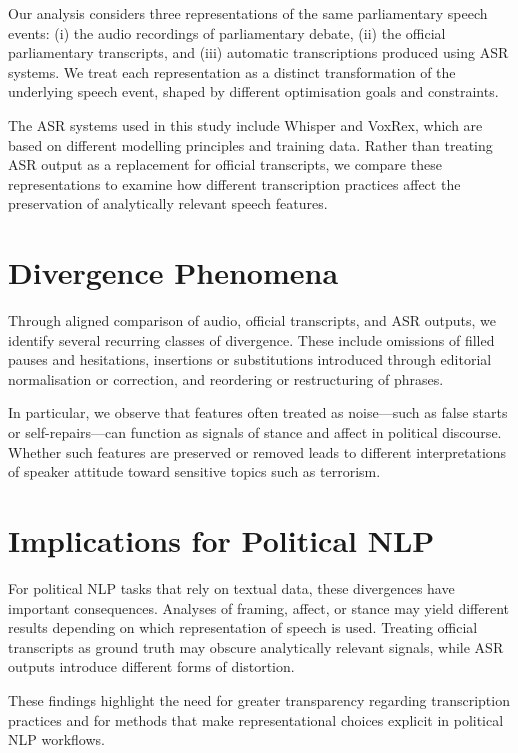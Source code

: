 \documentclass[10pt, a4paper]{article}
\begin{document}
Our analysis considers three representations of the same parliamentary speech events: (i) the audio recordings of parliamentary debate, (ii) the official parliamentary transcripts, and (iii) automatic transcriptions produced using ASR systems. We treat each representation as a distinct transformation of the underlying speech event, shaped by different optimisation goals and constraints.

The ASR systems used in this study include Whisper and VoxRex, which are based on different modelling principles and training data. Rather than treating ASR output as a replacement for official transcripts, we compare these representations to examine how different transcription practices affect the preservation of analytically relevant speech features.

\section{Divergence Phenomena}

Through aligned comparison of audio, official transcripts, and ASR outputs, we identify several recurring classes of divergence. These include omissions of filled pauses and hesitations, insertions or substitutions introduced through editorial normalisation or correction, and reordering or restructuring of phrases.

In particular, we observe that features often treated as noise—such as false starts or self-repairs—can function as signals of stance and affect in political discourse. Whether such features are preserved or removed leads to different interpretations of speaker attitude toward sensitive topics such as terrorism.

\section{Implications for Political NLP}

For political NLP tasks that rely on textual data, these divergences have important consequences. Analyses of framing, affect, or stance may yield different results depending on which representation of speech is used. Treating official transcripts as ground truth may obscure analytically relevant signals, while ASR outputs introduce different forms of distortion.

These findings highlight the need for greater transparency regarding transcription practices and for methods that make representational choices explicit in political NLP workflows.
\end{document}

